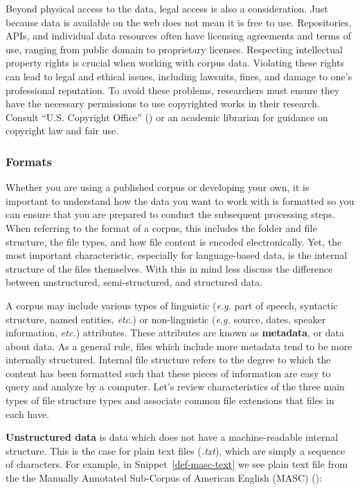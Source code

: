 \documentclass[
  letterpaper,
  krantz1]{latex/krantz-mod}
\theoremstyle{definition}
\theoremstyle{definition}
\theoremstyle{remark}
\begin{document}
Beyond physical access to the data, legal access is also a
consideration. Just because data is available on the web does not mean
it is free to use. Repositories, APIs, and individual data resources
often have licensing agreements and terms of use, ranging from public
domain to proprietary licenses. Respecting intellectual property rights
is crucial when working with corpus data. Violating these rights can
lead to legal and ethical issues, including lawsuits, fines, and damage
to one's professional reputation. To avoid these problems, researchers
must ensure they have the necessary permissions to use copyrighted works
in their research. Consult {``U.{S}. {Copyright Office}''}
() or an academic librarian for
guidance on copyright law and fair use.

\subsubsection{Formats}\label{formats}

Whether you are using a published corpus or developing your own, it is
important to understand how the data you want to work with is formatted
so you can ensure that you are prepared to conduct the subsequent
processing steps. When referring to the format of a corpus, this
includes the folder and file structure, the file types, and how file
content is encoded electronically. Yet, the most important
characteristic, especially for language-based data, is the internal
structure of the files themselves. With this in mind less discuss the
difference between unstructured, semi-structured, and structured data.

A corpus may include various types of linguistic (\emph{e.g.} part of
speech, syntactic structure, named entities, \emph{etc.}) or
non-linguistic (\emph{e.g.} source, dates, speaker information,
\emph{etc.}) attributes. These attributes are known as
\textbf{metadata}, or data about data. As a general rule, files which
include more metadata tend to be more internally structured. Internal
file structure refers to the degree to which the content has been
formatted such that these pieces of information are easy to query and
analyze by a computer. Let's review characteristics of the three main
types of file structure types and associate common file extensions that
files in each have.

\textbf{Unstructured data} is data which does not have a
machine-readable internal structure. This is the case for plain text
files (\emph{.txt}), which are simply a sequence of characters. For
example, in Snippet~\ref{def-masc-text} we see plain text file from the
the Manually Annotated Sub-Corpus of American English (MASC)
():
\end{document}
